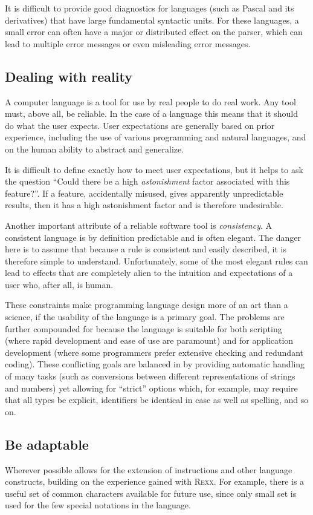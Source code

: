 It is difficult to provide good diagnostics for languages (such as
Pascal and its derivatives) that have large fundamental syntactic
units. For these languages, a small error can often have a major or
distributed effect on the parser, which can lead to multiple error
messages or even misleading error messages.

\subsection{Dealing with reality}
A computer language is a tool for use by real people to do real work. Any tool must, above all, be reliable. In the case of a language this means that it should do what the user expects. User expectations are generally based on prior experience, including the use of various programming and natural languages, and on the human ability to abstract and generalize.

It is difficult to define exactly how to meet user expectations, but it helps to ask the question “Could there be a high \emph{astonishment} factor associated with this feature?”. If a feature, accidentally misused, gives apparently unpredictable results, then it has a high astonishment factor and is therefore undesirable.

Another important attribute of a reliable software tool is \emph{consistency}. A consistent language is by definition predictable and is often elegant. The danger here is to assume that because a rule is consistent and easily described, it is therefore simple to understand. Unfortunately, some of the most elegant rules can lead to effects that are completely alien to the intuition and expectations of a user who, after all, is human.

These constraints make programming language design more of an art than
a science, if the usability of the language is a primary goal. The
problems are further compounded for \nr{} because the language is
suitable for both scripting (where rapid development and ease of use
are paramount) and for application development (where some programmers
prefer extensive checking and redundant coding). These conflicting
goals are balanced in \nr{} by providing automatic handling of many
tasks (such as conversions between different representations of
strings and numbers) yet allowing for “strict” options which, for
example, may require that all types be explicit, identifiers be
identical in case as well as spelling, and so on.

\subsection{Be adaptable}
Wherever possible \nr{} allows for the extension of instructions and other language constructs, building on the experience gained with R\textsc{exx}. For example, there is a useful set of common characters available for future use, since only small set is used for the few special notations in the language.

